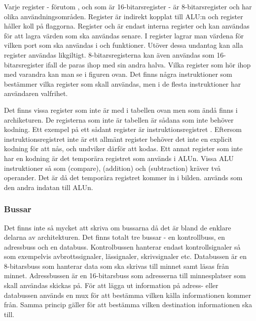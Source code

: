 \documentclass[main.tex]{subfiles}
\begin{document}
Varje register - förutom ,  och  som är
16-bitarsregister - är 8-bitarsregister och har olika användningsområden.
Register  är indirekt kopplat till ALU:n och register  håller
koll på flaggorna. Register  och  är endast interna register
och kan användas för att lagra värden som ska användas senare. I register
 lagrar man värdena för vilken port som ska användas i  och
 funktioner. Utöver dessa undantag kan alla register användas
likgiltigt. 8-bitarsregisterna kan även användas som 16-bitarsregister ifall de
paras ihop med sin andra halva. Vilka register som hör ihop med varandra kan
man se i figuren ovan. Det finns några instruktioner som bestämmer vilka
register som skall användas, men i de flesta instruktioner har användaren
valfrihet.

Det finns vissa register som inte är med i tabellen ovan men som ändå finns i
archiketuren. De registerna som inte är tabellen är sådana som inte behöver
kodning. Ett exempel på ett sådant register är instruktionsregistret .
Eftersom instruktionsregistret inte är ett allmänt register behöver det inte en
explicit kodning för att nås, och undviker därför att kodas. Ett annat register
som inte har en kodning är det temporära registret som används i ALUn.  Vissa
ALU instruktioner så som  (compare),  (addition) och
 (subtraction) kräver två operander. Det är då det temporära
registret  kommer in i bilden.  används som den andra
indatan till ALUn.

\subsubsection{Bussar}
Det finns inte så mycket att skriva om bussarna då det är bland de enklare
delarna av architekturen. Det finns totalt tre bussar - en kontrollbuss, en
adressbuss och en databuss. Kontrolbussen hanterar endast kontrollsignaler så
som exempelvis avbrottssignaler, lässignaler, skrivsignaler etc. Databussen är
en 8-bitarsbuss som hanterar data som ska skrivas till minnet samt läsas från
minnet. Adressbussen är en 16-bitarsbuss som adresserna till minnesplatser som
skall användas skickas på. För att lägga ut information på adress- eller
databussen används en mux för att bestämma vilken källa informationen kommer
från. Samma princip gäller för att bestämma vilken destination informationen
ska till.
\end{document}
